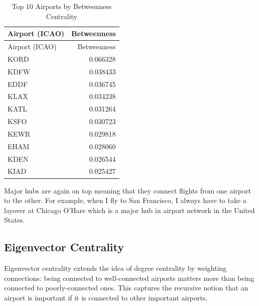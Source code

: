 \documentclass[
  letterpaper,
]{report}
\newenvironment{Shaded}{}{}
\newcommand{\AttributeTok}[1]{\textcolor[rgb]{0.84,0.23,0.29}{#1}}
\newcommand{\ConstantTok}[1]{\textcolor[rgb]{0.00,0.36,0.77}{#1}}
\newcommand{\DecValTok}[1]{\textcolor[rgb]{0.00,0.36,0.77}{#1}}
\newcommand{\FunctionTok}[1]{\textcolor[rgb]{0.44,0.26,0.76}{#1}}
\newcommand{\NormalTok}[1]{\textcolor[rgb]{0.14,0.16,0.18}{#1}}
\newcommand{\OtherTok}[1]{\textcolor[rgb]{0.44,0.26,0.76}{#1}}
\newcommand{\SpecialCharTok}[1]{\textcolor[rgb]{0.00,0.36,0.77}{#1}}
\newcommand{\StringTok}[1]{\textcolor[rgb]{0.01,0.18,0.38}{#1}}
\begin{document}
\begin{longtable}[]{@{}lr@{}}
\caption{Top 10 Airports by Betweenness Centrality}\tabularnewline
\toprule\noalign{}
Airport (ICAO) & Betweenness \\
\midrule\noalign{}
\endfirsthead
\toprule\noalign{}
Airport (ICAO) & Betweenness \\
\midrule\noalign{}
\endhead
\bottomrule\noalign{}
\endlastfoot
KORD & 0.066328 \\
KDFW & 0.038433 \\
EDDF & 0.036745 \\
KLAX & 0.034238 \\
KATL & 0.031264 \\
KSFO & 0.030723 \\
KEWR & 0.029818 \\
EHAM & 0.028060 \\
KDEN & 0.026544 \\
KIAD & 0.025427 \\
\end{longtable}

Major hubs are again on top meaning that they connect flights from one
airport to the other. For example, when I fly to San Francisco, I always
have to take a layover at Chicago O'Hare which is a major hub in airport
network in the United States.

\subsection{Eigenvector Centrality}\label{eigenvector-centrality}

Eigenvector centrality extends the idea of degree centrality by
weighting connections: being connected to well-connected airports
matters more than being connected to poorly-connected ones. This
captures the recursive notion that an airport is important if it is
connected to other important airports.

\begin{Shaded}
\end{Shaded}
\end{document}

